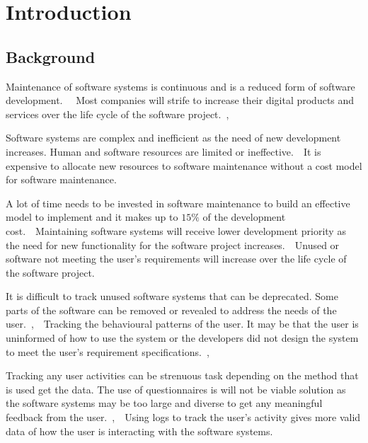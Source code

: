 \chapter{Introduction}
\label{chap:1}

\section{Background}

Maintenance of software systems is continuous and is a reduced form of software development.~\cite{Sneed2004}~ Most companies will strife to increase their digital products and services over the life cycle of the software project.~\cite{Niu2018},~\cite{Galster2019}\par 
Software systems are complex and inefficient as the need of new development increases. 
Human and software resources are limited or ineffective.~\cite{Pecchia2015}~It is expensive to allocate new resources to software maintenance without a cost model for software maintenance.~\cite{Galster2019}\par 
A lot of time needs to be invested in software maintenance to build an effective model to implement and it makes up to $15\%$ of the development cost.~\cite{Lenarduzzi2017}~Maintaining software systems will receive lower development priority as the need for new functionality for the software project increases.~\cite{Sneed2004}~Unused or software not meeting the user's requirements will increase over the life cycle of the software project.~\cite{Thankachan2018}\par 
It is difficult to track unused software systems that can be deprecated. Some parts of the software can be removed or revealed to address the needs of the user.~\cite{Dalpiaz2018},~\cite{Shahid2016}~Tracking the behavioural patterns of the user. It may be that the user is uninformed of how to use the system or the developers did not design the system to meet the user's requirement specifications.~\cite{Slaninova2014},~\cite{Chen2019}\par
Tracking any user activities can be strenuous task depending on the method that is used get the data. The use of questionnaires is will not be viable solution as the software systems may be too large and diverse to get any meaningful feedback from the user.~\cite{Slaninova2014},~\cite{Waqar2017}~Using logs to track the user's activity gives more valid data of how the user is interacting with the software systems.~\cite{Lei2018}

